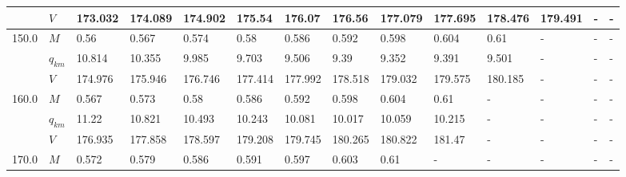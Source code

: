 \begin{tabular}{|l|l|llllllllllll|}
      & $V$ &  173.032 &  174.089 &  174.902 &                    175.54 &                    176.07 &                    176.56 &                   177.079 &  177.695\cellcolor{green} &                   178.476 &                   179.491 &                         - &                         - \\
\hline
150.0 & $M$ &     0.56 &    0.567 &    0.574 &                      0.58 &                     0.586 &                     0.592 &    0.598\cellcolor{green} &                     0.604 &                      0.61 &                         - &                         - &                         - \\
      & $q_{km}$ &   10.814 &   10.355 &    9.985 &                     9.703 &                     9.506 &                      9.39 &    9.352\cellcolor{green} &                     9.391 &                     9.501 &                         - &                         - &                         - \\
      & $V$ &  174.976 &  175.946 &  176.746 &                   177.414 &                   177.992 &                   178.518 &  179.032\cellcolor{green} &                   179.575 &                   180.185 &                         - &                         - &                         - \\
\hline
160.0 & $M$ &    0.567 &    0.573 &     0.58 &                     0.586 &                     0.592 &    0.598\cellcolor{green} &                     0.604 &                      0.61 &                         - &                         - &                         - &                         - \\
      & $q_{km}$ &    11.22 &   10.821 &   10.493 &                    10.243 &                    10.081 &   10.017\cellcolor{green} &                    10.059 &                    10.215 &                         - &                         - &                         - &                         - \\
      & $V$ &  176.935 &  177.858 &  178.597 &                   179.208 &                   179.745 &  180.265\cellcolor{green} &                   180.822 &                    181.47 &                         - &                         - &                         - &                         - \\
\hline
170.0 & $M$ &    0.572 &    0.579 &    0.586 &                     0.591 &    0.597\cellcolor{green} &                     0.603 &                      0.61 &                         - &                         - &                         - &                         - &                         - \\

\end{tabular}
